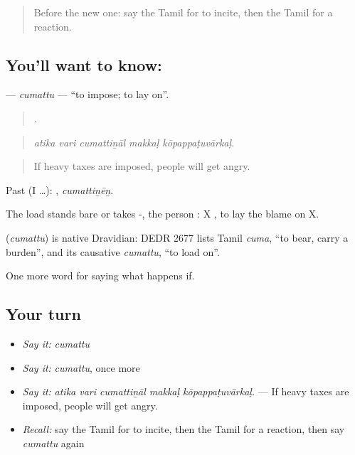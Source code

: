 \label{lesson:TA-C396-cumattu}



\begin{quote}
Before the new one: say the Tamil for to incite, then the Tamil for a reaction.
\end{quote}

\subsection*{You'll want to know: }
\textbf{} — \emph{cumattu} — \textquotedblleft{}to impose; to lay on\textquotedblright{}.

\begin{quote}
    .
\end{quote}

\begin{quote}
\emph{atika vari cumattiṉāl makkaḷ kōpappaṭuvārkaḷ.}
\end{quote}

\begin{quote}
If heavy taxes are imposed, people will get angry.
\end{quote}

Past (I …): , \emph{cumattiṉēṉ}.

The load stands bare or takes -, the person : X   , to lay the blame on X.

\begin{cousinweb}
\textbf{} (\emph{cumattu}) is native Dravidian: DEDR 2677 lists Tamil \emph{cuma}, \textquotedblleft{}to bear, carry a burden\textquotedblright{}, and its causative \emph{cumattu}, \textquotedblleft{}to load on\textquotedblright{}.
\end{cousinweb}

\begin{grammarlens}[title={What you've built}]
One more word for saying what happens if.
\end{grammarlens}

\subsection*{Your turn}
\begin{itemize}
\raggedright
  \item \emph{Say it:} \emph{cumattu}
  \item \emph{Say it:} \emph{cumattu}, once more
  \item \emph{Say it:} \emph{atika vari cumattiṉāl makkaḷ kōpappaṭuvārkaḷ.} — If heavy taxes are imposed, people will get angry.
  \item \emph{Recall:} say the Tamil for to incite, then the Tamil for a reaction, then say \emph{cumattu} again
\end{itemize}

